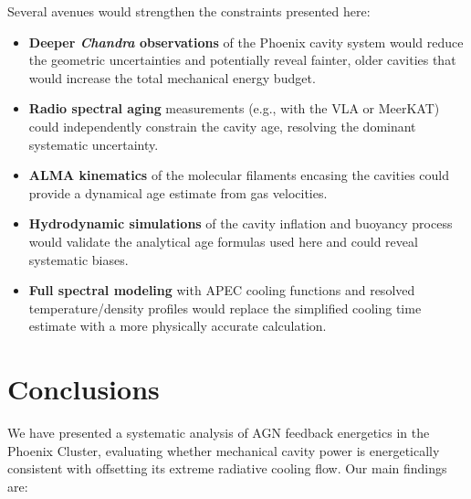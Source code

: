 \documentclass[twocolumn]{aastex63}
\begin{document}
Several avenues would strengthen the constraints presented here:
\begin{itemize}
  \item \textbf{Deeper \textit{Chandra} observations} of the Phoenix cavity
    system would reduce the geometric uncertainties and potentially reveal
    fainter, older cavities that would increase the total mechanical energy
    budget.
  \item \textbf{Radio spectral aging} measurements (e.g., with the VLA or
    MeerKAT) could independently constrain the cavity age, resolving the
    dominant systematic uncertainty.
  \item \textbf{ALMA kinematics} of the molecular filaments encasing the
    cavities could provide a dynamical age estimate from gas velocities.
  \item \textbf{Hydrodynamic simulations} of the cavity inflation and buoyancy
    process would validate the analytical age formulas used here and could
    reveal systematic biases.
  \item \textbf{Full spectral modeling} with APEC cooling functions and resolved
    temperature/density profiles would replace the simplified cooling time
    estimate with a more physically accurate calculation.
\end{itemize}

\section{Conclusions}
\label{sec:conclusions}

We have presented a systematic analysis of AGN feedback energetics in the
Phoenix Cluster, evaluating whether mechanical cavity power is energetically
consistent with offsetting its extreme radiative cooling flow. Our main findings are:
\end{document}
